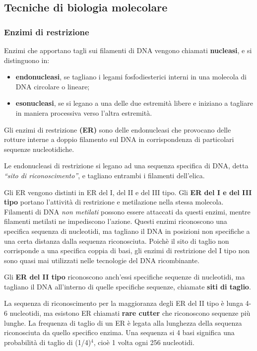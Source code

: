 \documentclass[]{article}
\date{}
\begin{document}
\subsection{Tecniche di biologia
molecolare}\label{tecniche-di-biologia-molecolare}

\subsubsection{Enzimi di restrizione}\label{enzimi-di-restrizione}

Enzimi che apportano tagli sui filamenti di DNA vengono chiamati
\textbf{nucleasi}, e si distinguono in:

\begin{itemize}
\itemsep1pt\parskip0pt
\item
  \textbf{endonucleasi}, se tagliano i legami fosfodiesterici interni in
  una molecola di DNA circolare o lineare;
\item
  \textbf{esonucleasi}, se si legano a una delle due estremità libere e
  iniziano a tagliare in maniera processiva verso l'altra estremità.
\end{itemize}

Gli enzimi di restrizione \textbf{(ER)} sono delle endonucleasi che
provocano delle rotture interne a doppio filamento sul DNA in
corrispondenza di particolari sequenze nucleotidiche.

Le endonucleasi di restrizione si legano ad una sequenza specifica di
DNA, detta \emph{``sito di riconoscimento''}, e tagliano entrambi i
filamenti dell'elica.

Gli ER vengono distinti in ER del I, del II e del III tipo. Gli
\textbf{ER del I e del III tipo} portano l'attività di restrizione e
metilazione nella stessa molecola. Filamenti di DNA \emph{non metilati}
possono essere attaccati da questi enzimi, mentre filamenti metilati ne
impediscono l'azione. Questi enzimi riconoscono una specifica sequenza
di nucleotidi, ma tagliano il DNA in posizioni non specifiche a una
certa distanza dalla sequenza riconosciuta. Poichè il sito di taglio non
corrisponde a una specifica coppia di basi, gli enzimi di restrizione
del I tipo non sono quasi mai utilizzati nelle tecnologie del DNA
ricombinante.

Gli \textbf{ER del II tipo} riconoscono anch'essi specifiche sequenze di
nucleotidi, ma tagliano il DNA all'interno di quelle specifiche
sequenze, chiamate \textbf{siti di taglio}.

La sequenza di riconoscimento per la maggioranza degli ER del II tipo è
lunga 4-6 nucleotidi, ma esistono ER chiamati \textbf{rare cutter} che
riconoscono sequenze più lunghe. La frequenza di taglio di un ER è
legata alla lunghezza della sequenza riconosciuta da quello specifico
enzima. Una sequenza si 4 basi significa una probabilità di taglio di
(1/4)\(^4\), cioè 1 volta ogni 256 nucleotidi.
\end{document}
